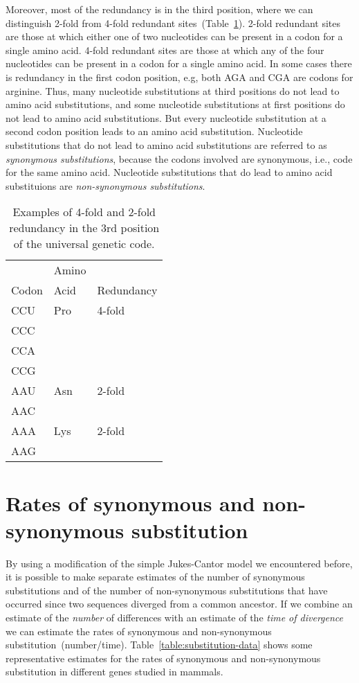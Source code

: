Moreover, most of the redundancy is in the third position, where we
can distinguish 2-fold from 4-fold redundant
sites~(Table~\ref{table:fold}). 2-fold redundant sites are those at
which either one of two nucleotides can be present in a codon for a
single amino acid. 4-fold redundant sites are those at which any of
the four nucleotides can be present in a codon for a single amino
acid. In some cases there is redundancy in the first codon position,
e.g, both AGA and CGA are codons for arginine. Thus, many nucleotide
substitutions at third positions do not lead to amino acid
substitutions, and some nucleotide substitutions at first positions do
not lead to amino acid substitutions. But every nucleotide
substitution at a second codon position leads to an amino acid
substitution. Nucleotide substitutions that do not lead to amino acid
substitutions are referred to as {\it synonymous substitutions},
because the codons involved are synonymous, i.e., code for the same
amino acid. Nucleotide substitutions that do lead to amino acid
substituions are {\it non-synonymous substitutions}.

\begin{table}
\begin{center}
\begin{tabular}{lll}
\hline\hline
      & Amino & \\
Codon & Acid  & Redundancy \\
\hline
CCU   & Pro   & 4-fold \\
CCC \\
CCA \\
CCG \\
\hline
AAU   & Asn   & 2-fold \\
AAC \\
AAA   & Lys   & 2-fold \\
AAG \\
\hline
\end{tabular}
\end{center}
\caption{Examples of 4-fold and 2-fold redundancy in the 3rd position
  of the universal genetic code.}\label{table:fold}
\end{table}

\section*{Rates of synonymous and non-synonymous substitution}

By using a modification of the simple Jukes-Cantor model we
encountered before, it is possible to make separate estimates of the
number of synonymous substitutions and of the number of non-synonymous
substitutions that have occurred since two sequences diverged from a
common ancestor. If we combine an estimate of the {\it number\/} of
differences with an estimate of the {\it time of divergence\/} we can
estimate the rates of synonymous and non-synonymous
substitution~(number/time). Table~\ref{table:substitution-data} shows
some representative estimates for the rates of synonymous and
non-synonymous substitution in different genes studied in
mammals.

